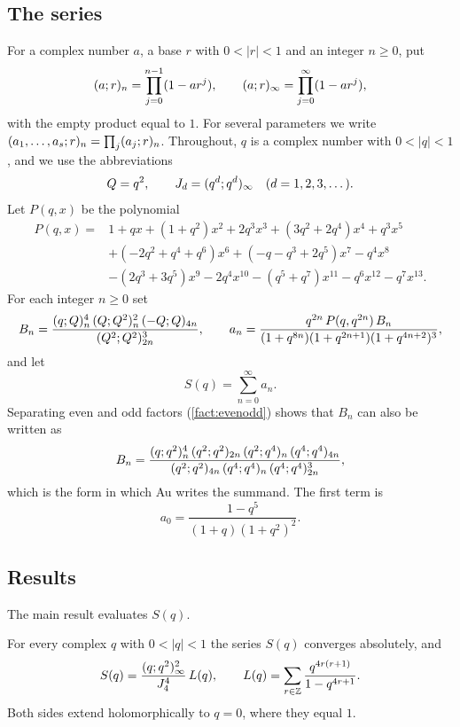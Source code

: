 \subsection{The series}\label{sec:series}
For a complex number $a$, a base $r$ with $0<|r|<1$ and an integer $n\ge0$,
put
\[
(a;r)_{n}=\prod_{j=0}^{n-1}(1-ar^j),\qquad
(a;r)_{\infty}=\prod_{j=0}^{\infty}(1-ar^j),
\]
with the empty product equal to $1$. For several parameters we write
$(a_1,\dots,a_s;r)_{n}=\prod_{j}(a_j;r)_{n}$. Throughout, $q$ is a
complex number with $0<|q|<1$, and we use the abbreviations
\[
Q=q^2,\qquad J_d=(q^d;q^d)_{\infty}\quad(d=1,2,3,\dots).
\]
Let $P(q,x)$ be the polynomial
\begin{equation}\label{eq:P}
\begin{aligned}
P(q,x)={}&1+qx+(1+q^2)x^2+2q^3x^3+(3q^2+2q^4)x^4+q^3x^5\\
&+(-2q^2+q^4+q^6)x^6+(-q-q^3+2q^5)x^7-q^4x^8\\
&-(2q^3+3q^5)x^9-2q^4x^{10}-(q^5+q^7)x^{11}-q^6x^{12}-q^7x^{13}.
\end{aligned}
\end{equation}
For each integer $n\ge0$ set
\begin{equation}\label{eq:Bn}
B_n=\frac{(q;Q)_{n}^4\,(Q;Q^2)_{n}^2\,(-Q;Q)_{4n}}
{(Q^2;Q^2)_{2n}^3},\qquad
a_n=\frac{q^{2n}\,P(q,q^{2n})\,B_n}
{(1+q^{8n})(1+q^{2n+1})(1+q^{4n+2})^3},
\end{equation}
and let
\[
S(q)=\sum_{n=0}^{\infty}a_n .
\]
Separating even and odd factors (\cref{fact:evenodd}) shows that $B_n$ can also be
written as
\[
B_n=\frac{(q;q^2)_{n}^4\,(q^2;q^2)_{2n}\,(q^2;q^4)_{n}\,
(q^4;q^4)_{4n}}
{(q^2;q^2)_{4n}\,(q^4;q^4)_{n}\,(q^4;q^4)_{2n}^3},
\]
which is the form in which Au writes the summand. The first term is
\begin{equation}\label{eq:a0}
a_0=\frac{1-q^5}{(1+q)(1+q^2)^2}.
\end{equation}

\subsection{Results}
The main result evaluates $S(q)$.

\begin{theorem}\label{thm:main}
For every complex $q$ with $0<|q|<1$ the series $S(q)$ converges absolutely,
and
\begin{equation}\label{eq:main}
S(q)=\frac{(q;q^2)_{\infty}^2}{J_4^4}\,L(q),\qquad
L(q)=\sum_{r\in\mathbb{Z}}\frac{q^{4r(r+1)}}{1-q^{4r+1}}.
\end{equation}
Both sides extend holomorphically to $q=0$, where they equal $1$.
\end{theorem}

